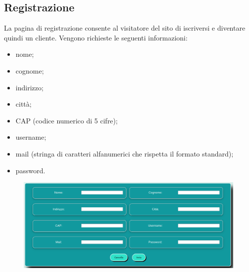 \documentclass[a4paper, 14pt]{article}
\begin{document}
\begin{flushleft}
			\subsection{Registrazione}
				La pagina di registrazione consente al visitatore del sito di iscriversi e diventare quindi un cliente.
				Vengono richieste le seguenti informazioni:
				\begin{itemize}
					\item nome;
					\item cognome;
					\item indirizzo;
					\item città;
					\item CAP (codice numerico di 5 cifre);
					\item username;
					\item mail (stringa di caratteri alfanumerici che rispetta il formato standard);
					\item password.
				\end{itemize}
				\begin{figure}[H]
					\includegraphics[width=\textwidth, frame=2pt]{"screenRegistrazione.png"}
				\end{figure}

			

\end{flushleft}
\end{document}
